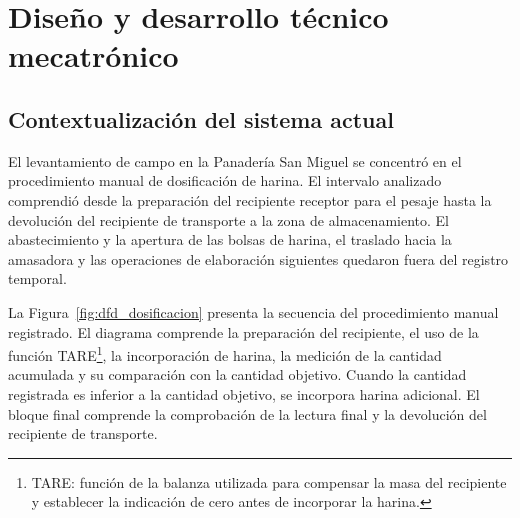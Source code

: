 \raggedbottom


\chapter{Diseño y desarrollo técnico mecatrónico}
\label{cap:diseno_tecnico}


\setcounter{section}{-1}


\section{Contextualización del sistema actual}
\label{subsec:antecedentes_problema}
\label{sec:contextualizacion}


El levantamiento de campo en la Panadería San Miguel se concentró en el
procedimiento manual de dosificación de harina. El intervalo analizado
comprendió desde la preparación del recipiente receptor para el pesaje
hasta la devolución del recipiente de transporte a la zona de
almacenamiento. El abastecimiento y la apertura de las bolsas de harina,
el traslado hacia la amasadora y las operaciones de elaboración siguientes
quedaron fuera del registro temporal.

La Figura~\ref{fig:dfd_dosificacion} presenta la secuencia del procedimiento
manual registrado. El diagrama comprende la preparación del recipiente,
el uso de la función TARE\footnote{TARE: función de la balanza utilizada
para compensar la masa del recipiente y establecer la indicación de cero
antes de incorporar la harina.}, la incorporación de harina, la medición
de la cantidad acumulada y su comparación con la cantidad objetivo. Cuando la cantidad registrada es
inferior a la cantidad objetivo, se incorpora harina adicional. El bloque
final comprende la comprobación de la lectura final y la devolución del
recipiente de transporte.

